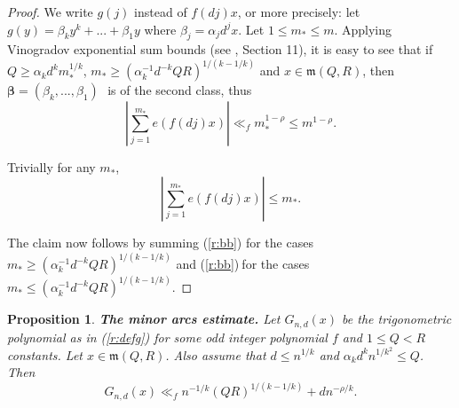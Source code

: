 \documentclass{amsart}
\newtheorem {proposition}{Proposition}
\numberwithin {equation}{section}
\begin{document}
\begin{proof}
We write $g(j)$ instead of $f(dj)x$, or more precisely: let $g(y)=\beta
_{k}y^{k}+...+\beta _{1}y$ where $\beta _{j}=\alpha _{j}d^{j}x$. Let $1\leq
m_{\ast }\leq m$. Applying Vinogradov exponential sum bounds (see \cite{Vinogradov:84}, Section 11), it is easy to see that if $Q\geq \alpha
_{k}d^{k}m_{\ast }^{1/k}$, $m_{\ast }\geq (\alpha
_{k}^{-1}d^{-k}QR)^{1/(k-1/k)}$ and $x\in {\mathfrak{m}}(Q,R)$, then ${\mathbf{\beta }}=(\beta _{k},...,\beta _{1})\,$\ is of the second class,
thus 
\begin{equation}
\left\vert \sum_{j=1}^{m_{\ast }}e(f(dj)x)\right\vert \ll _{f}m_{\ast
}^{1-\rho }\leq m^{1-\rho }.  \label{r:aa}
\end{equation}

Trivially for any $m_{\ast }$,\begin{equation}
\left\vert \sum_{j=1}^{m_{\ast }}e(f(dj)x)\right\vert \leq m_{\ast }.
\label{r:bb}
\end{equation}

The claim now follows by summing (\ref{r:bb}) for the cases $m_{\ast }\geq
\left( \alpha _{k}^{-1}d^{-k}QR\right) ^{1/(k-1/k)}$ and (\ref{r:bb})$\ $for
the cases $m_{\ast }\leq (\alpha _{k}^{-1}d^{-k}QR)^{1/(k-1/k)}$.
\end{proof}

\begin{proposition}
\label{p:minor}\textbf{The minor arcs estimate.} Let $G_{n,d}(x)$ be the
trigonometric polynomial as in (\ref{r:defg}) for some odd integer
polynomial $f$ and $1\leq Q<R$ constants. Let $x\in {\mathfrak{m}}(Q,R)$.
Also assume that $d\leq n^{1/k}$ and $\alpha _{k}d^{k}n^{1/k^{2}}\leq Q$.
Then 
\begin{equation*}
G_{n,d}(x)\ll _{f}n^{-1/k}\left (QR\right )^{1/(k-1/k)}+dn^{-\rho /k}{\text {.}}
\end{equation*}
\end{proposition}
\end{document}
